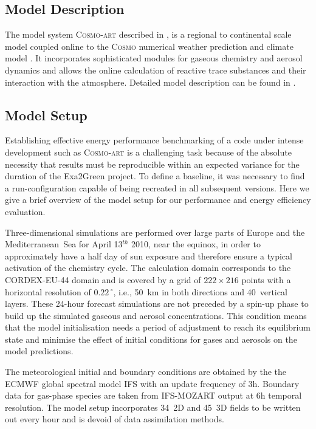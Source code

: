\subsection{Model Description}
\label{subsec:1.1}

The model  system \textsc{Cosmo-art} described  in \citep{Vogel-2009},
is  a  regional to  continental  scale  model  coupled online  to  the
\textsc{Cosmo}   numerical  weather   prediction  and   climate  model
\citep{Baldauf-2011}.   It   incorporates  sophisticated  modules  for
gaseous  chemistry   and  aerosol  dynamics  and   allows  the  online
calculation of  reactive trace  substances and their  interaction with
the  atmosphere.    Detailed  model   description  can  be   found  in
\citep{Bangert-2012, Knote-2011, Knote-2013}.

\subsection{Model Setup}
\label{subsec:1.2}

Establishing effective energy performance benchmarking of a code under
intense development  such as \textsc{Cosmo-art} is  a challenging task
because of  the absolute necessity  that results must  be reproducible
within  an  expected  variance  for  the  duration  of  the  Exa2Green
pro\-je\-ct.  To   define  a  baseline,   it  was  necessary  to   find  a
run-configuration  capable  of   being  recreated  in  all  subsequent
versions.  Here  we give a brief  overview of the model  setup for our
performance and energy efficiency evaluation.

Three-dimensional simulations are performed over large parts of Europe
and the Mediterranean~Sea for April 13$^{th}$ 2010, near the equinox, in order to approximately
have a half  day  of  sun  exposure and  therefore  ensure  a typical
activation of the chemistry cycle.  The calculation domain corresponds
to the CORDEX-EU-44 domain and is covered by a grid of $222\times 216$
points with  a horizontal resolution of  $0.22\,^{\circ}$, i.e., 50~km
in  both directions  and 40~vertical  layers.  These  24-hour forecast
simulations  are not  preceded  by  a spin-up  phase  to build up  the
simulated gaseous and  aerosol concentrations.  This condition means 
that the model initialisation needs a period of adjustment to reach its equilibrium  state and minimise  the effect of
initial conditions for gases and aerosols on the model predictions.

The meteorological initial and boundary conditions are obtained by the
the ECMWF  global spectral model IFS  with an update  frequency of 3h.
Boundary data  for gas-phase species are taken  from IFS-MOZART output
at  6h temporal resolution.   The model  setup incorporates  34~2D and
45~3D  fields to  be written  out  every hour  and is  devoid of  data
assimilation methods.

